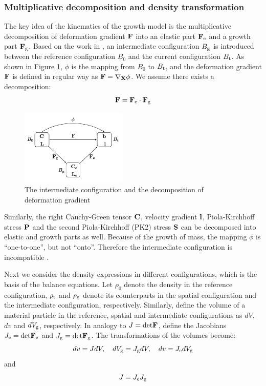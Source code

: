 \subsubsection{Multiplicative decomposition and density transformation}
The key idea of the kinematics of the growth model is the multiplicative decomposition of deformation gradient $\bold{F}$ into an elastic part $\bold{F}_{\mathrm{e}}$ and a growth part $\bold{F}_{\mathrm{g}}$. Based on the work in \cite{Himpel, Goktepe2}, an intermediate configuration $B_{\mathrm{g}}$ is introduced between the reference configuration $B_0$ and the current configuration $B_{\mathrm{t}}$. As shown in Figure \ref{fig:decomposition},
$\phi$ is the mapping from $B_0$ to $B_{\mathrm{t}}$, and the deformation gradient $\bold{F}$ is defined in regular way as $\bold{F} = \nabla_{\bold{X}} \phi$. We assume there exists a decomposition:
\begin{equation} \label{eq:decomposition}
\bold{F} = \bold{F}_{\mathrm{e}} \cdot \bold{F}_{\mathrm{g}}
\end{equation}

\begin{figure}[H]
	\centering
	\includegraphics[width=0.45\textwidth]{./figs/decomposition.png}
	\caption{The intermediate configuration and the decomposition of deformation gradient}
	\label{fig:decomposition}
\end{figure}

Similarly, the right Cauchy-Green tensor $\bold{C}$, velocity gradient $\bold{l}$, Piola-Kirchhoff stress $\bold{P}$ and the second Piola-Kirchhoff (PK2) stress $\bold{S}$ can be decomposed into elastic and growth parts as well.  Because of the growth of mass, the mapping $\phi$ is ``one-to-one'', but not ``onto''. Therefore the intermediate configuration is incompatible \cite{Cowin}.

Next we consider the density expressions in different configurations, which is the basis of the balance equations. Let $\rho_0$ denote the density in the reference configuration, $\rho_{\mathrm{t}}$ and $\rho_{\mathrm{g}}$ denote its counterparts in the spatial configuration and the intermediate configuration, respectively. Similarly, define the volume of a material particle in the reference,  spatial and intermediate configurations as $dV$, $dv$ and $dV_{\mathrm{g}}$, respectively. In analogy to $J = \mathrm{det}\bold{F}$, define the Jacobians $J_{\mathrm{e}} = \mathrm{det}\bold{F}_\mathrm{e}$ and $J_{\mathrm{g}} = \mathrm{det}\bold{F}_\mathrm{g}$. The transformations of the volumes become:
\begin{equation} \label{eq:volume}
dv = JdV, \quad dV_{\mathrm{g}} = J_{\mathrm{g}} dV, \quad dv = J_{\mathrm{e}} dV_{\mathrm{g}}
\end{equation}
and
\begin{equation} \label{eq:det}
J = J_{\mathrm{e}} J_{\mathrm{g}}
\end{equation}


